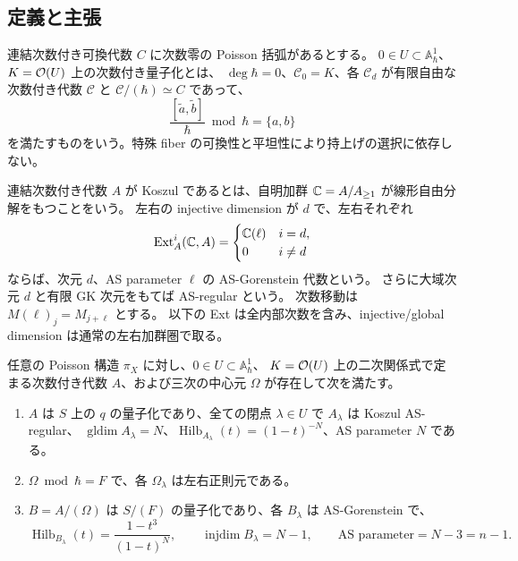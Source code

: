 \subsection{定義と主張}
\begin{definition}
連結次数付き可換代数 $C$ に次数零の Poisson 括弧があるとする。
$0\in U\subset\mathbb A^1_\hbar$、$K=\mathcal O(U)$ 上の次数付き量子化とは、
$\deg\hbar=0$、$\mathcal C_0=K$、各 $\mathcal C_d$ が有限自由な
次数付き代数 $\mathcal C$ と $\mathcal C/(\hbar)\simeq C$ であって、
\[
\frac{[\widetilde a,\widetilde b]}\hbar\bmod\hbar=\{a,b\}
\]
を満たすものをいう。特殊 fiber の可換性と平坦性により持上げの選択に依存しない。
\end{definition}
連結次数付き代数 $A$ が Koszul であるとは、自明加群 $\mathbb C=A/A_{\geq1}$ が線形自由分解をもつことをいう。
左右の injective dimension が $d$ で、左右それぞれ
\[
\operatorname{Ext}_A^i(\mathbb C,A)=
\begin{cases}\mathbb C(\ell)&i=d,\\0&i\neq d\end{cases}
\]
ならば、次元 $d$、AS parameter $\ell$ の AS-Gorenstein 代数という。
さらに大域次元 $d$ と有限 GK 次元をもてば AS-regular という。
次数移動は $M(\ell)_j=M_{j+\ell}$ とする。
以下の Ext は全内部次数を含み、injective/global dimension は通常の左右加群圏で取る。

\begin{theorem}[代数的量子化]\label{thm:pg-quantization}\label{pthm:quantization}
任意の Poisson 構造 $\pi_X$ に対し、$0\in U\subset\mathbb A^1_\hbar$、
$K=\mathcal O(U)$ 上の二次関係式で定まる次数付き代数 $A$、および三次の中心元 $\Omega$ が存在して次を満たす。
\begin{enumerate}
\item $A$ は $S$ 上の $q$ の量子化であり、全ての閉点 $\lambda\in U$ で
$A_\lambda$ は Koszul AS-regular、
$\operatorname{gldim}A_\lambda=N$、$\operatorname{Hilb}_{A_\lambda}(t)=(1-t)^{-N}$、AS parameter $N$ である。
\item $\Omega\bmod\hbar=F$ で、各 $\Omega_\lambda$ は左右正則元である。
\item $B=A/(\Omega)$ は $S/(F)$ の量子化であり、各 $B_\lambda$ は AS-Gorenstein で、
\[
\operatorname{Hilb}_{B_\lambda}(t)=\frac{1-t^3}{(1-t)^N},\qquad
\operatorname{injdim}B_\lambda=N-1,\qquad
\text{AS parameter}=N-3=n-1.
\]
\end{enumerate}
\end{theorem}

